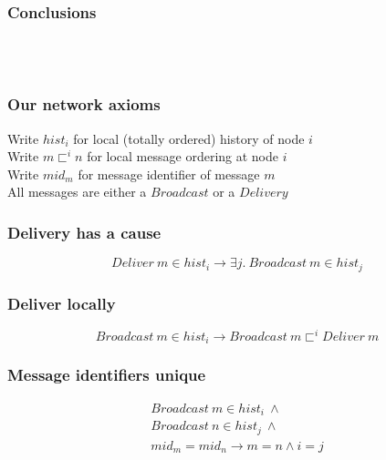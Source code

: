\documentclass[professionalfonts,smallfonts]{beamer}
\begin{document}
\begin{frame}
\frametitle{Conclusions}
\\[1.5ex]
\\[1.5ex]
\end{frame}

\begin{frame}
\frametitle{Our network axioms}
Write $hist_i$ for local (totally ordered) history of node $i$
\\[1.5ex]
Write $m \sqsubset^i n$ for local message ordering at node $i$
\\[1.5ex]
Write $mid_m$ for message identifier of message $m$
\\[1.5ex]
All messages are either a $Broadcast$ or a $Delivery$
\end{frame}

\begin{frame}
\frametitle{Delivery has a cause}
\begin{displaymath}
Deliver\ m \in hist_i \longrightarrow \exists j.\ Broadcast\ m \in hist_j
\end{displaymath}
\end{frame}

\begin{frame}
\frametitle{Deliver locally}
\begin{displaymath}
Broadcast\ m \in hist_i \longrightarrow Broadcast\ m \sqsubset^i Deliver\ m
\end{displaymath}
\end{frame}

\begin{frame}
\frametitle{Message identifiers unique}
\begin{gather*}
Broadcast\ m \in hist_i\ \wedge \\
Broadcast\ n \in hist_j\ \wedge \\
mid_m = mid_n \longrightarrow m = n \wedge i = j
\end{gather*}
\end{frame}
\end{document}
